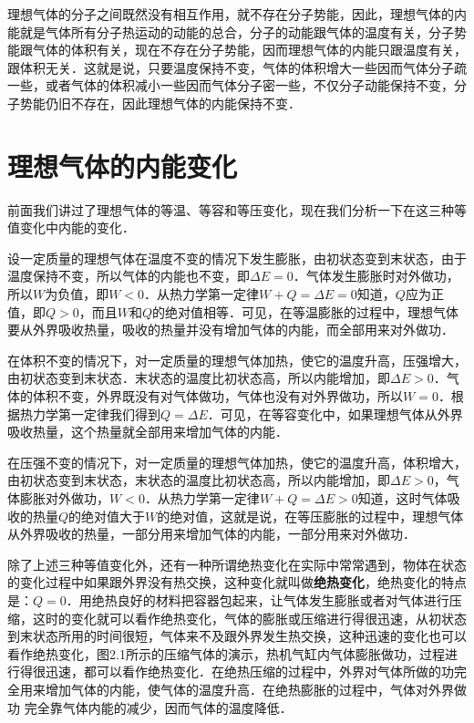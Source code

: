 理想气体的分子之间既然没有相互作用，就不存在分子势能，因此，理想气体的内能就是气体所有分子热运动的动能的总合，分子的动能跟气体的温度有关，分子势能跟气体的体积有关，现在不存在分子势能，因而理想气体的内能只跟温度有关，跟体积无关．这就是说，只要温度保持不变，气体的体积增大一些因而气体分子疏一些，或者气体的体积减小一些因而气体分子密一些，不仅分子动能保持不变，分子势能仍旧不存在，因此理想气体的内能保持不变．

\section{理想气体的内能变化}
前面我们讲过了理想气体的等温、等容和等压变化，现在我们分析一下在这三种等值变化中内能的变化．

设一定质量的理想气体在温度不变的情况下发生膨胀，由初状态变到末状态，由于温度保持不变，所以气体的内能也不变，即$\Delta E=0$．气体发生膨胀时对外做功，所以$W$为负值，即$W<0$．从热力学第一定律$W+Q=\Delta E=0$知道，$Q$应为正值，即$Q>0$，而且$W$和$Q$的绝对值相等．可见，在等温膨胀的过程中，理想气体要从外界吸收热量，吸收的热量并没有增加气体的内能，而全部用来对外做功．

在体积不变的情况下，对一定质量的理想气体加热，使它的温度升高，压强增大，由初状态变到末状态．末状态的温度比初状态高，所以内能增加，即$\Delta E>0$．气体的体积不变，外界既没有对气体做功，气体也没有对外界做功，所以$W=0$．根据热力学第一定律我们得到$Q=\Delta E$．可见，在等容变化中，如果理想气体从外界吸收热量，这个热量就全部用来增加气体的内能．

在压强不变的情况下，对一定质量的理想气体加热，使它的温度升高，体积增大，由初状态变到末状态，末状态的温度比初状态高，所以内能增加，即$\Delta E>0$，气体膨胀对外做功，$W<0$．从热力学第一定律$W+Q=\Delta E>0$知道，这时气体吸收的热量$Q$的绝对值大于$W$的绝对值，这就是说，在等压膨胀的过程中，理想气体从外界吸收的热量，一部分用来增加气体的内能，一部分用来对外做功．

除了上述三种等值变化外，还有一种所谓绝热变化在实际中常常遇到，物体在状态的变化过程中如果跟外界没有热交换，这种变化就叫做\textbf{绝热变化}，绝热变化的特点是：$Q=0$．用绝热良好的材料把容器包起来，让气体发生膨胀或者对气体进行压缩，这时的变化就可以看作绝热变化，气体的膨胀或压缩进行得很迅速，从初状态到末状态所用的时间很短，气体来不及跟外界发生热交换，这种迅速的变化也可以看作绝热变化，图2.1所示的压缩气体的演示，热机气缸内气体膨胀做功，过程进行得很迅速，都可以看作绝热变化．在绝热压缩的过程中，外界对气体所做的功完全用来增加气体的内能，使气体的温度升高．在绝热膨胀的过程中，气体对外界做功
完全靠气体内能的减少，因而气体的温度降低．


